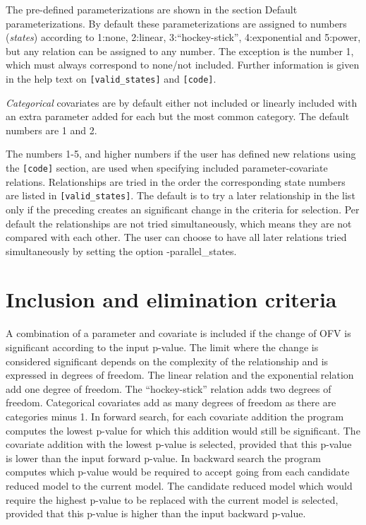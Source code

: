 The pre-defined parameterizations are shown in the section Default parameterizations. By default these parameterizations are assigned to numbers (\emph{states}) according to 1:none,  2:linear, 3:“hockey-stick”, 4:exponential and 5:power, but any relation can be assigned to any number. The exception is the number 1, which must always correspond to none/not included. Further information is given in the help text on \verb|[valid_states]| and \verb|[code]|. 

\emph{Categorical} covariates are by default either not included or linearly included with an extra parameter added for each but the most common category. The default numbers are 1 and 2.

The numbers 1-5, and higher numbers if the user has defined new relations using the \verb|[code]| section, are used when specifying included parameter-covariate relations. Relationships are tried in the order the corresponding state numbers are listed in \verb|[valid_states]|. The default is to try a later relationship in the list only if the preceding creates an significant change in the criteria for selection. Per default the relationships are not tried simultaneously, which means they are not compared with each other. The user can choose to have all later relations tried simultaneously by setting the option -parallel\_states.

\section{Inclusion and elimination criteria}
A combination of a parameter and covariate is included if the change of OFV is significant according to the input p-value. The limit where the change is considered significant depends on the complexity of the relationship and is expressed in degrees of freedom. The linear relation and the exponential relation add one degree of freedom. The “hockey-stick” relation adds two degrees of freedom. Categorical covariates add as many degrees of freedom as there are categories minus 1. In forward search, for each covariate addition the program computes the lowest p-value for which this addition would still be significant. The covariate addition with the lowest p-value is selected, provided that this p-value is lower than the input forward p-value. In backward search the program computes which p-value would be required to accept going from each candidate reduced model to the current model. The candidate reduced model which would require the highest p-value to be replaced with the current model is selected, provided that this p-value is higher than the input backward p-value. 

